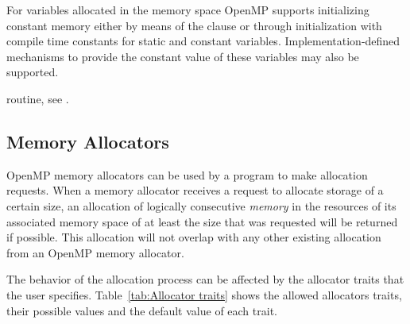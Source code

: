 \linenumbers

\begin{note}
For variables allocated in the  memory space OpenMP 
supports initializing constant memory either by means of the  
clause or through initialization with compile time constants for static and 
constant variables. Implementation-defined mechanisms to provide the constant 
value of these variables may also be supported.
 \end{note}


\begin{crossrefs}
\item {} routine, see .
\end{crossrefs}

\subsection{Memory Allocators}
\label{subsec:Memory Allocators}

OpenMP memory allocators can be used by a program to make allocation requests. 
When a memory allocator receives a request to allocate storage of a certain size, 
an allocation of logically consecutive \emph{memory} in the resources of its 
associated memory space of at least the size that was requested will be returned
if possible. This allocation will not overlap with any other existing allocation 
from an OpenMP memory allocator. 

The behavior of the allocation process can be affected by the allocator traits 
that the user specifies. Table~\ref{tab:Allocator traits} shows the allowed allocators 
traits, their possible values and the default value of each trait.

